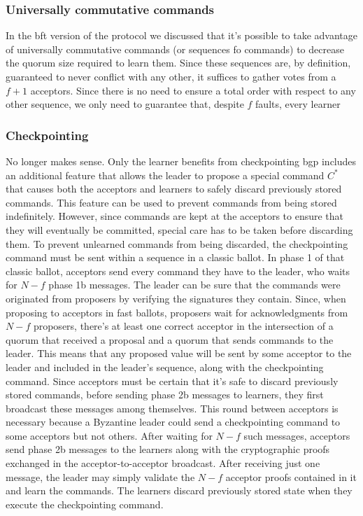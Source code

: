\subsubsection{Universally commutative commands}
In the \acrshort{bft} version of the protocol we discussed that it's possible to take advantage of universally commutative commands (or sequences fo commands) to decrease the quorum size required to learn them. Since these sequences are, by definition, guaranteed to never conflict with any other, it suffices to gather votes from a $f+1$ acceptors. Since there is no need to ensure a total order with respect to any other sequence, we only need to guarantee that, despite $f$ faults, every learner 

\subsubsection{Checkpointing} {\color{red} No longer makes sense. Only the learner benefits from checkpointing} \acrshort{bgp} includes an additional feature that allows the leader to propose a special command $C^*$ that causes both the acceptors and learners to safely discard previously stored commands. This feature can be used to prevent commands from being stored indefinitely. However, since commands are kept at the acceptors to ensure that they will eventually be committed, special care has to be taken before discarding them. To prevent unlearned commands from being discarded, the checkpointing command must be sent within a sequence in a classic ballot. In phase 1 of that classic ballot, acceptors send every command they have to the leader, who waits for $N-f$ phase 1b messages. The leader can be sure that the commands were originated from proposers by verifying the signatures they contain. Since, when proposing to acceptors in fast ballots, proposers wait for acknowledgments from $N-f$ proposers, there's at least one correct acceptor in the intersection of a quorum that received a proposal and a quorum that sends commands to the leader. This means that any proposed value will be sent by some acceptor to the leader and included in the leader's sequence, along with the checkpointing command. Since acceptors must be certain that it's safe to discard previously stored commands, before sending phase 2b messages to learners, they first broadcast these messages among themselves. This round between acceptors is necessary because a Byzantine leader could send a checkpointing command to some acceptors but not others. After waiting for $N-f$ such messages, acceptors send phase 2b messages to the learners along with the cryptographic proofs exchanged in the acceptor-to-acceptor broadcast. After receiving just one message, the leader may simply validate the $N-f$ acceptor proofs contained in it and learn the commands. The learners discard previously stored state when they execute the checkpointing command.\par


